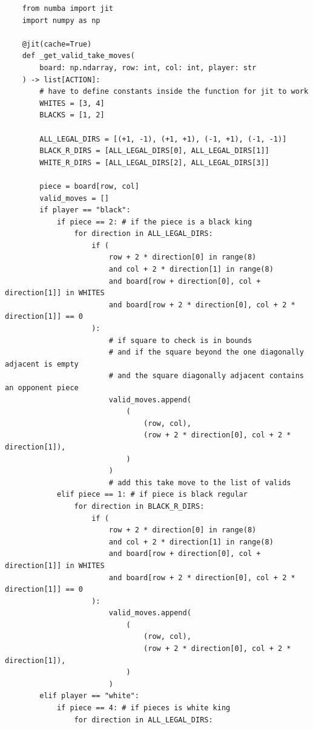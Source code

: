\documentclass{article}
\makeatletter
\newcommand\subsubsubsection{\@startsection{paragraph}{4}{\z@}{-2.5ex\@plus -1ex \@minus -.25ex}{1.25ex \@plus .25ex}{\normalfont\normalsize\bfseries}}
\makeatother
\begin{document}
    \subsubsubsection{Jit Function}
    \begin{verbatim}
    from numba import jit
    import numpy as np

    @jit(cache=True)
    def _get_valid_take_moves(
        board: np.ndarray, row: int, col: int, player: str
    ) -> list[ACTION]:
        # have to define constants inside the function for jit to work
        WHITES = [3, 4] 
        BLACKS = [1, 2]

        ALL_LEGAL_DIRS = [(+1, -1), (+1, +1), (-1, +1), (-1, -1)]
        BLACK_R_DIRS = [ALL_LEGAL_DIRS[0], ALL_LEGAL_DIRS[1]]
        WHITE_R_DIRS = [ALL_LEGAL_DIRS[2], ALL_LEGAL_DIRS[3]]

        piece = board[row, col]
        valid_moves = []
        if player == "black":
            if piece == 2: # if the piece is a black king
                for direction in ALL_LEGAL_DIRS:
                    if (
                        row + 2 * direction[0] in range(8)
                        and col + 2 * direction[1] in range(8)
                        and board[row + direction[0], col + direction[1]] in WHITES
                        and board[row + 2 * direction[0], col + 2 * direction[1]] == 0
                    ):
                        # if square to check is in bounds
                        # and if the square beyond the one diagonally adjacent is empty
                        # and the square diagonally adjacent contains an opponent piece
                        valid_moves.append(
                            (
                                (row, col),
                                (row + 2 * direction[0], col + 2 * direction[1]),
                            )
                        )
                        # add this take move to the list of valids
            elif piece == 1: # if piece is black regular
                for direction in BLACK_R_DIRS:
                    if (
                        row + 2 * direction[0] in range(8)
                        and col + 2 * direction[1] in range(8)
                        and board[row + direction[0], col + direction[1]] in WHITES
                        and board[row + 2 * direction[0], col + 2 * direction[1]] == 0
                    ):
                        valid_moves.append(
                            (
                                (row, col),
                                (row + 2 * direction[0], col + 2 * direction[1]),
                            )
                        )
        elif player == "white":
            if piece == 4: # if pieces is white king
                for direction in ALL_LEGAL_DIRS:

\end{verbatim}
\end{document}
